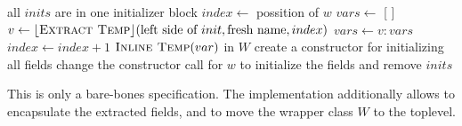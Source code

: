 \begin{algorithm}
\caption{$\refactoring{PassInitsToConstructor}(inits : \listtp{InitializerBlock}, w : Field)$}\label{alg:PassInitsToConstructor}
\begin{algorithmic}[1]
\STATE \assert all $inits$ are in one initializer block
\STATE $index\leftarrow$ possition of $w$
\STATE $vars\leftarrow$ [ ]
  \STATE $v\leftarrow\lfloor\textsc{Extract Temp}\rfloor(\text{left side of $init$}, \text{fresh name}, index)$ 
  \STATE $vars\leftarrow v : vars$
  \STATE $index\leftarrow index + 1$
\ENDFOR
{}
  \STATE $\textsc{Inline Temp}(var)$
\ENDFOR
\STATE in $W$ create a constructor for initializing all fields
\STATE change the constructor call for $w$ to initialize the fields and remove $inits$
\end{algorithmic}
\end{algorithm}

This is only a bare-bones specification. The implementation additionally allows to encapsulate the extracted fields, and to move the wrapper class $W$ to the toplevel.
